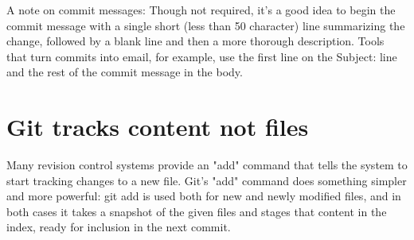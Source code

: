 A note on commit messages: Though not required, it's a good idea to begin the
commit message with a single short (less than 50 character) line summarizing
the change, followed by a blank line and then a more thorough description.
Tools that turn commits into email, for example, use the first line on the
Subject: line and the rest of the commit message in the body.

\section{Git tracks content not files}
Many revision control systems provide an "add" command that tells the system to
start tracking changes to a new file. Git's "add" command does something
simpler and more powerful: git add is used both for new and newly modified
files, and in both cases it takes a snapshot of the given files and stages that
content in the index, ready for inclusion in the next commit.
